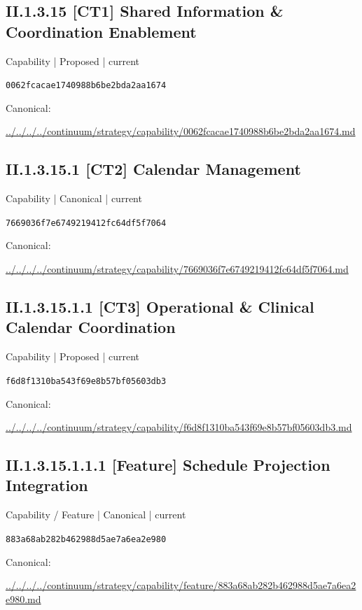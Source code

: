 \documentclass[10pt,a4paper]{article}
\begin{document}
\subsection*{II.1.3.15 [CT1] Shared Information \& Coordination Enablement}
{\small Capability | Proposed | current}\par
\texttt{0062fcacae1740988b6be2bda2aa1674}\par
Canonical: \par
{\footnotesize\url{../../../../continuum/strategy/capability/0062fcacae1740988b6be2bda2aa1674.md}}\par
\subsection*{II.1.3.15.1 [CT2] Calendar Management}
{\small Capability | Canonical | current}\par
\texttt{7669036f7e6749219412fc64df5f7064}\par
Canonical: \par
{\footnotesize\url{../../../../continuum/strategy/capability/7669036f7e6749219412fc64df5f7064.md}}\par
\subsection*{II.1.3.15.1.1 [CT3] Operational \& Clinical Calendar Coordination}
{\small Capability | Proposed | current}\par
\texttt{f6d8f1310ba543f69e8b57bf05603db3}\par
Canonical: \par
{\footnotesize\url{../../../../continuum/strategy/capability/f6d8f1310ba543f69e8b57bf05603db3.md}}\par
\subsection*{II.1.3.15.1.1.1 [Feature] Schedule Projection Integration}
{\small Capability / Feature | Canonical | current}\par
\texttt{883a68ab282b462988d5ae7a6ea2e980}\par
Canonical: \par
{\footnotesize\url{../../../../continuum/strategy/capability/feature/883a68ab282b462988d5ae7a6ea2e980.md}}\par
\end{document}
